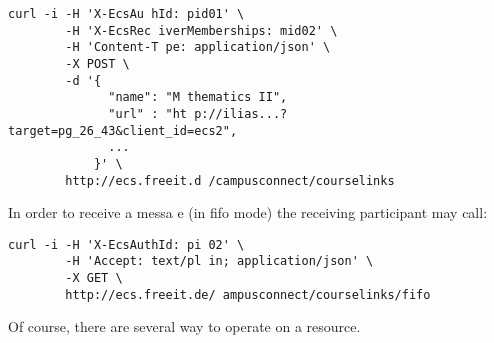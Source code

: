 \begin{verbatim}   
curl -i -H 'X-EcsAu hId: pid01' \
        -H 'X-EcsRec iverMemberships: mid02' \
        -H 'Content-T pe: application/json' \
        -X POST \      
        -d '{           
              "name": "M thematics II",
              "url" : "ht p://ilias...?target=pg_26_43&client_id=ecs2",
              ...          
            }' \            
        http://ecs.freeit.d /campusconnect/courselinks
\end{verbatim}              
In order to receive a messa e (in fifo mode) the receiving
participant may call:       
\begin{verbatim}            
curl -i -H 'X-EcsAuthId: pi 02' \
        -H 'Accept: text/pl in; application/json' \
        -X GET \             
        http://ecs.freeit.de/ ampusconnect/courselinks/fifo
\end{verbatim}                 
                                
Of course, there are several way  to operate on a resource. 

